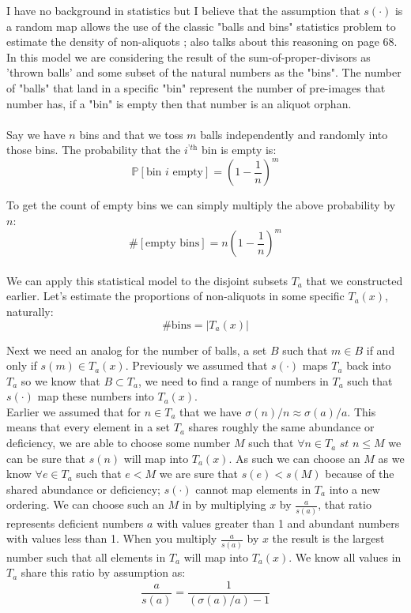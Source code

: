 \documentclass[12pt]{amsart}
\theoremstyle{definition}
\numberwithin{equation}{section}
\begin{document}
I have no background in statistics but I believe that the assumption that $s(\cdot)$ is a random map allows the use of the classic "balls and bins" statistics problem to estimate the density of non-aliquots  \cite{balls}; \cite{riele} also talks about this reasoning on page 68. In this model we are considering the result of the sum-of-proper-divisors as 'thrown balls' and some subset of the natural numbers as the "bins". The number of "balls" that land in a specific "bin" represent the number of pre-images that number has, if a "bin" is empty then that number is an aliquot orphan.\\
\\
Say we have $n$ bins and that we toss $m$ balls independently and randomly into those bins. The probability that the $i^{\textit{'th}}$ bin is empty is:$$ \mathbb{P}[\text{bin } i \text{ empty}] = (1- \frac{1}{n})^m$$

To get the count of empty bins we can simply multiply the above probability by $n$:$$ \# [\text{empty bins}] = n(1- \frac{1}{n})^m$$\\

We can apply this statistical model to the disjoint subsets $T_a$ that we constructed earlier. Let's estimate the proportions of non-aliquots in some specific $T_a(x)$, naturally:
$$\text{\# bins} = |T_a(x)|$$

Next we need an analog for the number of balls, a set $B$ such that $m \in B$ if and only if $s(m) \in T_a(x)$. Previously we assumed that $s(\cdot)$ maps $T_a$ back into $T_a$ so we know that $B \subset T_a$, we need to find a range of numbers in $T_a$ such that $s(\cdot)$ map these numbers into $T_a(x)$.\\

Earlier we assumed that for $n \in T_a $ that we have $\sigma(n)/n \approx \sigma(a)/a $. This means that every element in a set $T_a$ shares roughly the same abundance or deficiency, we are able to choose some number $M$ such that $\forall n \in T_a \textit{ st } n \leq M$ we can be sure that $s(n)$ will map into $T_a(x)$. As such we can choose an $M$ as we know $\forall e \in T_a$ such that $e < M$ we are sure that $s(e) < s(M)$ because of the shared abundance or deficiency; $s(\cdot)$ cannot map elements in $T_a$ into a new ordering. We can choose such an $M$ in by multiplying $x$ by $\frac{a}{s(a)}$, that ratio represents deficient numbers $a$ with values greater than 1 and abundant numbers with values less than 1. When you multiply $\frac{a}{s(a)}$ by $x$ the result is the largest number such that all elements in $T_a$ will map into $T_a(x)$. We know all values in $T_a$ share this ratio by assumption as:
$$\frac{a}{s(a)} = \frac{1}{(\sigma(a)/a)-1}$$
\end{document}
